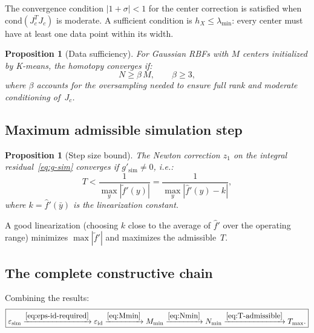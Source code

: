 \documentclass[11pt,a4paper]{article}
\newtheorem{proposition}[theorem]{Proposition}
\begin{document}
The convergence condition $|1 + \sigma| < 1$ for the center correction is satisfied when $\mathrm{cond}(J_c^T J_c)$ is moderate. A sufficient condition is $h_X \leq \lambda_{\min}$: every center must have at least one data point within its width.

\begin{proposition}[Data sufficiency]\label{prop:Nmin}
For Gaussian RBFs with $M$ centers initialized by K-means, the homotopy converges if:
\begin{equation}
N \geq \beta\,M, \qquad \beta \geq 3,
\label{eq:Nmin}
\end{equation}
where $\beta$ accounts for the oversampling needed to ensure full rank and moderate conditioning of~$J_c$.
\end{proposition}

\subsection{Maximum admissible simulation step}

\begin{proposition}[Step size bound]\label{prop:Tmax-sim}
The Newton correction $z_1$ on the integral residual~\eqref{eq:g-sim} converges if $g'_{\mathrm{sim}} \neq 0$, i.e.:
\begin{equation}
T < \frac{1}{\max_y |\tilde{f}'(y)|} = \frac{1}{\max_y |\hat{f}'(y) - k|},
\label{eq:T-admissible}
\end{equation}
where $k = \hat{f}'(\bar{y})$ is the linearization constant.
\end{proposition}

A good linearization (choosing $k$ close to the average of $\hat{f}'$ over the operating range) minimizes $\max|\tilde{f}'|$ and maximizes the admissible~$T$.

\subsection{The complete constructive chain}

Combining the results:
\begin{equation}
\boxed{\varepsilon_{\mathrm{sim}} \xrightarrow{\eqref{eq:eps-id-required}} \varepsilon_{\mathrm{id}} \xrightarrow{\eqref{eq:Mmin}} M_{\min} \xrightarrow{\eqref{eq:Nmin}} N_{\min} \xrightarrow{\eqref{eq:T-admissible}} T_{\max}.}
\label{eq:chain}
\end{equation}
\end{document}
